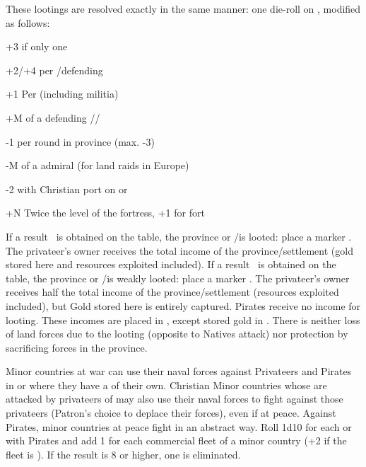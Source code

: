  These lootings are resolved
exactly in the same manner: one die-roll on , modified as follows:
\begin{modlist}
\item[+3] if only one \corsaire\facemoins
\item[+2/+4] per \ARMY\facemoins/\Faceplus defending
\item[+1] Per \LD (including militia) %
\item[+M] \Man of a defending \LeaderG/\LeaderC/\LeaderGov
\item[-1] per round in province (max. -3) %
\item[-M] \Man of a \corsaire admiral (\textonehalf for land raids in Europe)
\item[-2]  with Christian port on  or
\item[+N] Twice the level of the fortress, +1 for fort
\end{modlist}
\bparag If a result \textddag\ is obtained on the table, the province or
\TP/\COL is looted: place a marker \PILLAGE\faceplus. The privateer's owner
receives the total income of the province/settlement (gold stored here and
resources exploited included).
\bparag If a result \textdag\ is obtained on the table, the province or
\TP/\COL is weakly looted: place a marker \PILLAGE\facemoins. The privateer's
owner receives half the total income of the province/settlement (resources
exploited included), but Gold stored here is entirely captured.
\bparag Pirates receive no income for looting.
\bparag These incomes are placed in , except
stored gold in .
\bparag There is neither loss of land forces due to the looting (opposite to
Natives attack) nor protection by sacrificing forces in the province.

\bparag Minor countries at war can use their naval forces against Privateers
and Pirates in \STZ or \CTZ where they have a \TradeFLEET of their own.
\bparag Christian Minor countries whose \TradeFLEET are attacked by privateers
of  may also use their naval forces to fight against those
privateers (Patron's choice to deplace their forces), even if at peace.
\bparag Against Pirates, minor countries at peace fight in an abstract way.
Roll 1d10 for each \STZ or \CTZ with Pirates and add 1 for each commercial
fleet of a minor country (+2 if the fleet is \Faceplus).  If the result is 8
or higher, one \corsaire\facemoins is eliminated.



